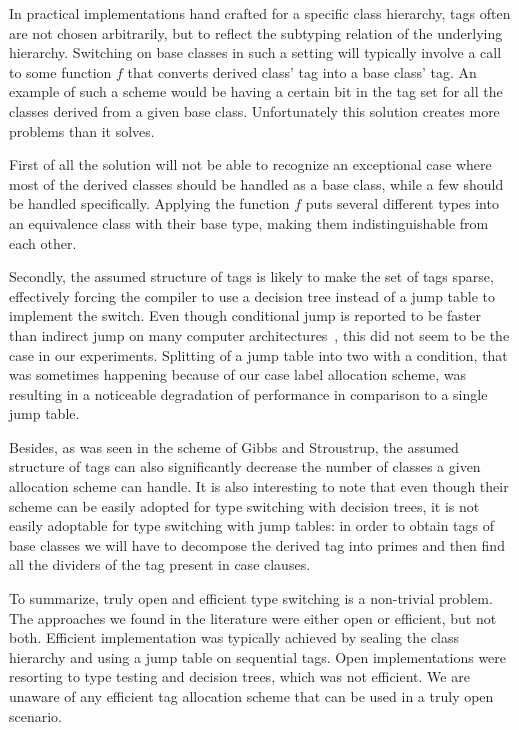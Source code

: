 \documentclass[preprint]{sigplanconf}
\begin{document}
In practical implementations hand crafted for a specific class hierarchy, tags 
often are not chosen arbitrarily, but to reflect the subtyping relation of the 
underlying hierarchy. Switching on base classes in such a setting will typically 
involve a call to some function $f$ that converts derived class' tag into a base 
class' tag. An example of such a scheme would be having a certain bit in the tag 
set for all the classes derived from a given base class. Unfortunately this 
solution creates more problems than it solves.

First of all the solution will not be able to recognize an exceptional case 
where most of the derived classes should be handled as a base class, while a few 
should be handled specifically. Applying the function $f$ puts several different 
types into an equivalence class with their base type, making them 
indistinguishable from each other.

Secondly, the assumed structure of tags is likely to make the set of tags 
sparse, effectively forcing the compiler to use a decision tree instead of a jump 
table to implement the switch. Even though conditional jump is reported to be 
faster than indirect jump on many computer architectures~\cite[]{garrigue-98}, this did not seem to be the case in our experiments. Splitting 
of a jump table into two with a condition, that was sometimes happening because 
of our case label allocation scheme, was resulting in a noticeable degradation of 
performance in comparison to a single jump table.

Besides, as was seen in the scheme of Gibbs and Stroustrup, the assumed 
structure of tags can also significantly decrease the number of classes a given 
allocation scheme can handle. It is also interesting to note that even though 
their scheme can be easily adopted for type switching with decision trees, it is 
not easily adoptable for type switching with jump tables: in order to obtain 
tags of base classes we will have to decompose the derived tag into primes and 
then find all the dividers of the tag present in case clauses.

To summarize, truly open and efficient type switching is a non-trivial problem.
The approaches we found in the literature were either open or efficient, 
but not both. Efficient implementation was typically achieved by sealing the 
class hierarchy and using a jump table on sequential tags. Open implementations 
were resorting to type testing and decision trees, which was not efficient. 
We are unaware of any efficient tag allocation scheme that can be used in a 
truly open scenario.
\end{document}
